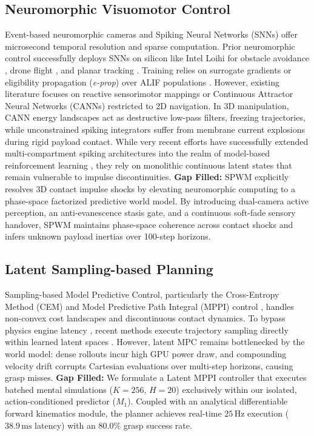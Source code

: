 \documentclass{article}
\begin{document}
\subsection{Neuromorphic Visuomotor Control}
Event-based neuromorphic cameras \cite{gallego2020event, lichtsteiner2008128} and Spiking Neural Networks (SNNs) \cite{maass1997networks, roy2019towards} offer microsecond temporal resolution and sparse computation. Prior neuromorphic control successfully deploys SNNs on silicon like Intel Loihi \cite{davies2018loihi, orchad2021loihi2} for obstacle avoidance \cite{sanket2020evdodge}, drone flight \cite{vitale2021event, paredessalles2023fully}, and planar tracking \cite{tieck2018controlling, dewolf2016spiking}. Training relies on surrogate gradients \cite{neftci2019surrogate, zenke2018superspike} or eligibility propagation (\textit{e-prop}) over ALIF populations \cite{bellec2018long, bellec2020solution}. However, existing literature focuses on reactive sensorimotor mappings or Continuous Attractor Neural Networks (CANNs) \cite{wu2008dynamics} restricted to 2D navigation. In 3D manipulation, CANN energy landscapes act as destructive low-pass filters, freezing trajectories, while unconstrained spiking integrators suffer from membrane current explosions during rigid payload contact. While very recent efforts have successfully extended multi-compartment spiking architectures into the realm of model-based reinforcement learning \cite{sun2025spikingwm}, they rely on monolithic continuous latent states that remain vulnerable to impulse discontinuities. \textbf{Gap Filled:} SPWM explicitly resolves 3D contact impulse shocks by elevating neuromorphic computing to a phase-space factorized predictive world model. By introducing dual-camera active perception, an anti-evanescence stasis gate, and a continuous soft-fade sensory handover, SPWM maintains phase-space coherence across contact shocks and infers unknown payload inertias over 100-step horizons.

\subsection{Latent Sampling-based Planning}
Sampling-based Model Predictive Control, particularly the Cross-Entropy Method (CEM) \cite{rubinstein1999cross, chua2018deep} and Model Predictive Path Integral (MPPI) control \cite{williams2016aggressive, williams2017information}, handles non-convex cost landscapes and discontinuous contact dynamics. To bypass physics engine latency \cite{todorov2012mujoco}, recent methods execute trajectory sampling directly within learned latent spaces \cite{hafner2019learning, hansen2022temporal, hansen2024tdmpc2}. However, latent MPC remains bottlenecked by the world model: dense rollouts incur high GPU power draw, and compounding velocity drift corrupts Cartesian evaluations over multi-step horizons, causing grasp misses. \textbf{Gap Filled:} We formulate a Latent MPPI controller that executes batched mental simulations ($K=256$, $H=20$) exclusively within our isolated, action-conditioned predictor ($M_1$). Coupled with an analytical differentiable forward kinematics module, the planner achieves real-time $25\,\text{Hz}$ execution ($38.9\,\text{ms}$ latency) with an $80.0\%$ grasp success rate.
\end{document}
